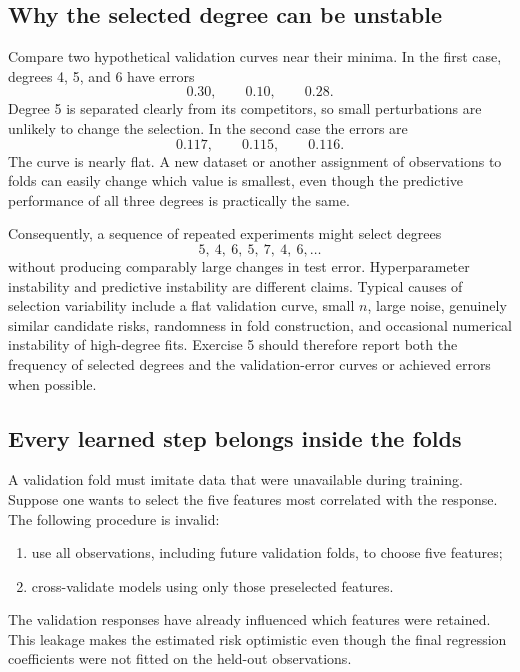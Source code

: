 \documentclass[11pt,a4paper]{article}
\begin{document}
\subsection{Why the selected degree can be unstable}

Compare two hypothetical validation curves near their minima. In the first case, degrees 4, 5, and 6 have errors
\begin{equation*}
  0.30,\qquad 0.10,\qquad 0.28.
\end{equation*}
Degree 5 is separated clearly from its competitors, so small perturbations are unlikely to change the selection. In the second case the errors are
\begin{equation*}
  0.117,\qquad 0.115,\qquad 0.116.
\end{equation*}
The curve is nearly flat. A new dataset or another assignment of observations to folds can easily change which value is smallest, even though the predictive performance of all three degrees is practically the same.

Consequently, a sequence of repeated experiments might select degrees
\begin{equation*}
  5,\ 4,\ 6,\ 5,\ 7,\ 4,\ 6,\ldots
\end{equation*}
without producing comparably large changes in test error. Hyperparameter instability and predictive instability are different claims. Typical causes of selection variability include a flat validation curve, small $n$, large noise, genuinely similar candidate risks, randomness in fold construction, and occasional numerical instability of high-degree fits. Exercise 5 should therefore report both the frequency of selected degrees and the validation-error curves or achieved errors when possible.

\subsection{Every learned step belongs inside the folds}

A validation fold must imitate data that were unavailable during training. Suppose one wants to select the five features most correlated with the response. The following procedure is invalid:
\begin{enumerate}
  \item use all observations, including future validation folds, to choose five features;
  \item cross-validate models using only those preselected features.
\end{enumerate}
The validation responses have already influenced which features were retained. This leakage makes the estimated risk optimistic even though the final regression coefficients were not fitted on the held-out observations.
\end{document}
